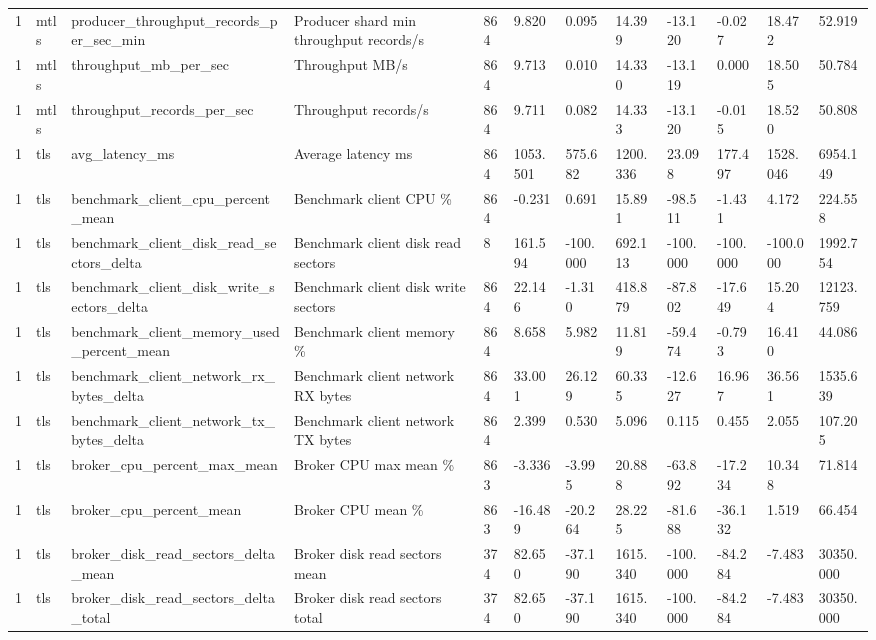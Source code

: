 \begin{longtable}{llllllllllll}
1 & mtls & producer\_throughput\_records\_per\_sec\_min & Producer shard min throughput records/s & 864 & 9.820 & 0.095 & 14.399 & -13.120 & -0.027 & 18.472 & 52.919 \\
1 & mtls & throughput\_mb\_per\_sec & Throughput MB/s & 864 & 9.713 & 0.010 & 14.330 & -13.119 & 0.000 & 18.505 & 50.784 \\
1 & mtls & throughput\_records\_per\_sec & Throughput records/s & 864 & 9.711 & 0.082 & 14.333 & -13.120 & -0.015 & 18.520 & 50.808 \\
1 & tls & avg\_latency\_ms & Average latency ms & 864 & 1053.501 & 575.682 & 1200.336 & 23.098 & 177.497 & 1528.046 & 6954.149 \\
1 & tls & benchmark\_client\_cpu\_percent\_mean & Benchmark client CPU \% & 864 & -0.231 & 0.691 & 15.891 & -98.511 & -1.431 & 4.172 & 224.558 \\
1 & tls & benchmark\_client\_disk\_read\_sectors\_delta & Benchmark client disk read sectors & 8 & 161.594 & -100.000 & 692.113 & -100.000 & -100.000 & -100.000 & 1992.754 \\
1 & tls & benchmark\_client\_disk\_write\_sectors\_delta & Benchmark client disk write sectors & 864 & 22.146 & -1.310 & 418.879 & -87.802 & -17.649 & 15.204 & 12123.759 \\
1 & tls & benchmark\_client\_memory\_used\_percent\_mean & Benchmark client memory \% & 864 & 8.658 & 5.982 & 11.819 & -59.474 & -0.793 & 16.410 & 44.086 \\
1 & tls & benchmark\_client\_network\_rx\_bytes\_delta & Benchmark client network RX bytes & 864 & 33.001 & 26.129 & 60.335 & -12.627 & 16.967 & 36.561 & 1535.639 \\
1 & tls & benchmark\_client\_network\_tx\_bytes\_delta & Benchmark client network TX bytes & 864 & 2.399 & 0.530 & 5.096 & 0.115 & 0.455 & 2.055 & 107.205 \\
1 & tls & broker\_cpu\_percent\_max\_mean & Broker CPU max mean \% & 863 & -3.336 & -3.995 & 20.888 & -63.892 & -17.234 & 10.348 & 71.814 \\
1 & tls & broker\_cpu\_percent\_mean & Broker CPU mean \% & 863 & -16.489 & -20.264 & 28.225 & -81.688 & -36.132 & 1.519 & 66.454 \\
1 & tls & broker\_disk\_read\_sectors\_delta\_mean & Broker disk read sectors mean & 374 & 82.650 & -37.190 & 1615.340 & -100.000 & -84.284 & -7.483 & 30350.000 \\
1 & tls & broker\_disk\_read\_sectors\_delta\_total & Broker disk read sectors total & 374 & 82.650 & -37.190 & 1615.340 & -100.000 & -84.284 & -7.483 & 30350.000 \\

\end{longtable}
